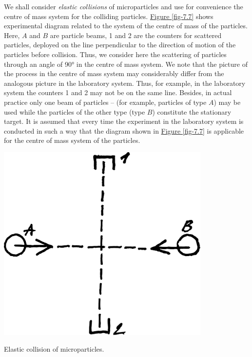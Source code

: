 \documentclass[a4paper,sfsidenotes,colorlinks=true]{tufte-book}
\numberwithin{equation}{section}
\numberwithin{figure}{section}
\begin{document}
We shall  consider \emph{elastic collisions} of microparticles and use for convenience the centre of mass system for the colliding particles. \hyperref[fig-7.7]{Figure \ref{fig-7.7}} shows experimental diagram related to the system of the centre of mass of the particles. Here, $A$ and $B$ are particle beams, \textsf{1} and \textsf{2} are the counters for scattered particles, deployed on the line perpendicular to the direction of motion of the particles before collision. Thus, we consider here the scattering of particles through an angle of \ang{90} in the centre of mass system. We note that the picture of the process in the centre of mass system may considerably differ from the analogous picture in the laboratory system. Thus, for example, in the laboratory system the counters \textsf{1} and \textsf{2} may not be on the same line. Besides, in actual practice only one beam of particles -- (for example, particles of type $A$) may be used while the particles of the other type (type $B$) constitute the stationary target. It is assumed that every time the experiment in the laboratory system is conducted in such a way that the diagram shown in \hyperref[fig-7.7]{Figure \ref{fig-7.7}} is applicable for the centre of mass system of the particles.

\begin{marginfigure}%
\centering
\includegraphics[width=0.8\textwidth,angle=2]{figures/fig-07-07.pdf}
\caption{Elastic collision of microparticles.}
\label{fig-7.7}
\end{marginfigure}
\end{document}
